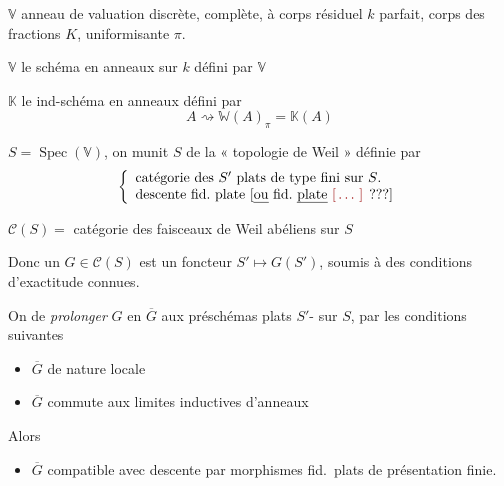 \documentclass[11pt,a4paper]{article}
\begin{document}
$\mathbb{V}$ anneau de valuation discrète, complète, à corps résiduel $k$
parfait, corps des fractions $K$, uniformisante $\pi$.

$\mathbb{V}$ le schéma en anneaux sur $k$ défini par $\mathbb{V}$

$\mathbb{K}$ le ind-schéma en anneaux défini par
\[
A \rightsquigarrow \mathbb{W}(A)_{\pi} = \mathbb{K}(A)
\]

$S = \operatorname{Spec}(\mathbb{V})$, on munit $S$ de la « topologie de Weil »
définie par
\[
\left\lbrace
\begin{array}{l}
\text{catégorie des $S'$ plats de type fini sur $S$.} \\
\text{descente fid.\ plate [\uncertain{ou} fid.\ \uncertain{plate} \ill{} ???]}
\end{array}\right.
\]


$\mathcal{C}(S) = $ catégorie des faisceaux de Weil abéliens sur $S$

Donc un $G \in \mathcal{C}(S)$ est un foncteur $S' \mapsto G(S')$, soumis
à des conditions d'exactitude connues.

On  de \emph{prolonger} $G$ en $\overline{G}$ aux
préschémas plats $S'$- sur $S$, par les conditions
suivantes
\begin{itemize}
\item[(i)] $\overline{G}$ de nature locale
\item[(ii)] $\overline{G}$ commute aux limites inductives d'anneaux
\end{itemize}
Alors \ill{}  
\begin{itemize}
\item[(iii)] $\overline{G}$ compatible avec descente par morphismes fid.\
plats de présentation finie.
\end{itemize}
\end{document}
